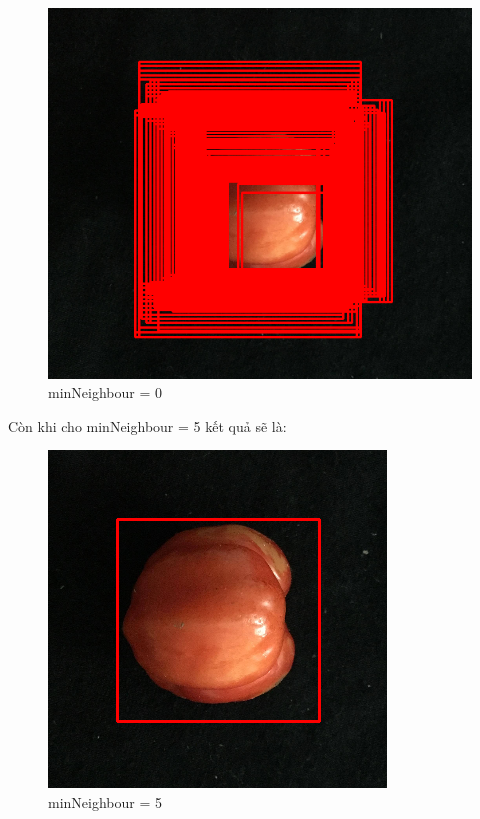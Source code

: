 \documentclass[12pt,a4paper]{article}
\begin{document}
\begin{itemize}
\begin{itemize}
\begin{center}
\begin{figure}[htp]
    \begin{center}
    \includegraphics[scale=.4]{Images/zero}
    \end{center}
    \caption{minNeighbour = 0}
    \end{figure}
\end{center}
Còn khi cho minNeighbour = 5 kết quả sẽ là:
\begin{center}
    \begin{figure}[htp]
    \begin{center}
    \includegraphics[scale=.4]{Images/five}
    \end{center}
    \caption{minNeighbour = 5}
    \end{figure}
\end{center}
\end{itemize}
\end{itemize}
\end{document}
